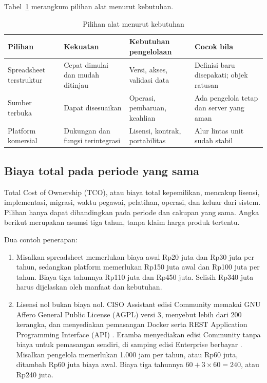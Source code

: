 Tabel~\ref{tab:ch14-pilihan-alat} merangkum pilihan alat menurut kebutuhan.

\begin{table}[!htb]
  \centering\small
  \caption{Pilihan alat menurut kebutuhan}\label{tab:ch14-pilihan-alat}
  \begin{tabularx}{\textwidth}{|>{\raggedright\arraybackslash}p{}|>{\raggedright\arraybackslash}X|>{\raggedright\arraybackslash}X|>{\raggedright\arraybackslash}X|}
    \hline
    \textbf{Pilihan} & \textbf{Kekuatan} & \textbf{Kebutuhan pengelolaan} & \textbf{Cocok bila} \\
    \hline
    Spreadsheet terstruktur & Cepat dimulai dan mudah ditinjau & Versi, akses, validasi data &
    Definisi baru disepakati; objek ratusan \\ \hline
    Sumber terbuka & Dapat disesuaikan & Operasi, pembaruan, keahlian & Ada pengelola tetap dan
    server yang aman \\ \hline
    Platform komersial & Dukungan dan fungsi terintegrasi & Lisensi, kontrak, portabilitas & Alur
    lintas unit sudah stabil \\ \hline
  \end{tabularx}
\end{table}

\subsection*{Biaya total pada periode yang sama}

Total Cost of Ownership (TCO), atau biaya total kepemilikan, mencakup lisensi, implementasi,
migrasi, waktu pegawai, pelatihan, operasi, dan keluar dari sistem. Pilihan hanya dapat
dibandingkan pada periode dan cakupan yang sama. Angka berikut merupakan asumsi tiga tahun, tanpa
klaim harga produk tertentu.

Dua contoh penerapan:
\begin{enumerate}
  \item Misalkan spreadsheet memerlukan biaya awal Rp20 juta dan Rp30 juta per tahun, sedangkan
  platform memerlukan Rp150 juta awal dan Rp100 juta per tahun. Biaya tiga tahunnya Rp110 juta dan
  Rp450 juta. Selisih Rp340 juta harus dijelaskan oleh manfaat dan kebutuhan.
  \item Lisensi nol bukan biaya nol. CISO Assistant edisi Community memakai GNU Affero General
  Public License (AGPL) versi 3, menyebut lebih dari 200 kerangka, dan menyediakan pemasangan
  Docker serta REST Application Programming Interface (API) \cite{c14-ciso-assistant}. Eramba
  menyediakan edisi Community tanpa biaya untuk pemasangan sendiri, di samping edisi Enterprise
  berbayar \cite{c14-eramba}. Misalkan pengelola memerlukan 1.000 jam per tahun, atau Rp60 juta,
  ditambah Rp60 juta biaya awal. Biaya tiga tahunnya $60 + 3 \times 60 = 240$, atau Rp240 juta.
\end{enumerate}


